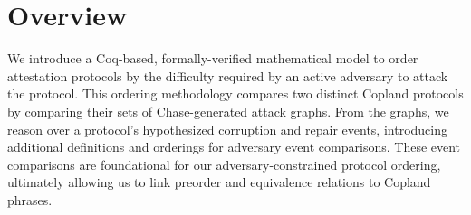 \documentclass[runningheads]{llncs}
\theoremstyle{definition}
\begin{document}





\section{Overview}

We introduce a Coq-based, formally-verified mathematical model to order attestation protocols by the difficulty required by an active adversary to attack the protocol. This ordering methodology compares two distinct Copland protocols by comparing their sets of Chase-generated attack graphs. From the graphs, we reason over a protocol's hypothesized corruption and repair events, introducing additional definitions and orderings for adversary event comparisons. These event comparisons are foundational for our adversary-constrained protocol ordering, ultimately allowing us to link preorder and equivalence relations to Copland phrases.
\end{document}
